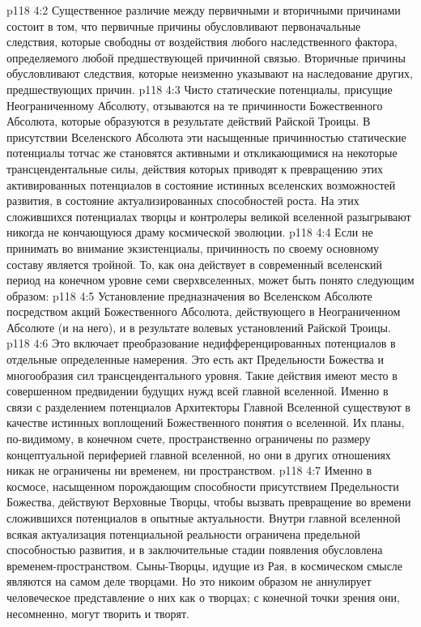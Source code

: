 \vs p118 4:2 Существенное различие между первичными и вторичными причинами состоит в том, что первичные причины обусловливают первоначальные следствия, которые свободны от воздействия любого наследственного фактора, определяемого любой предшествующей причинной связью. Вторичные причины обусловливают следствия, которые неизменно указывают на наследование других, предшествующих причин.
\vs p118 4:3 \pc Чисто статические потенциалы, присущие Неограниченному Абсолюту, отзываются на те причинности Божественного Абсолюта, которые образуются в результате действий Райской Троицы. В присутствии Вселенского Абсолюта эти насыщенные причинностью статические потенциалы тотчас же становятся активными и откликающимися на некоторые трансцендентальные силы, действия которых приводят к превращению этих активированных потенциалов в состояние истинных вселенских возможностей развития, в состояние актуализированных способностей роста. На этих сложившихся потенциалах творцы и контролеры великой вселенной разыгрывают никогда не кончающуюся драму космической эволюции.
\vs p118 4:4 Если не принимать во внимание экзистенциалы, причинность по своему основному составу является тройной. То, как она действует в современный вселенский период на конечном уровне семи сверхвселенных, может быть понято следующим образом:
\vs p118 4:5 \bibnobreakspace {} Установление предназначения во Вселенском Абсолюте посредством акций Божественного Абсолюта, действующего в Неограниченном Абсолюте (и на него), и в результате волевых установлений Райской Троицы.
\vs p118 4:6 \bibnobreakspace {} Это включает преобразование недифференцированных потенциалов в отдельные определенные намерения. Это есть акт Предельности Божества и многообразия сил трансцендентального уровня. Такие действия имеют место в совершенном предвидении будущих нужд всей главной вселенной. Именно в связи с разделением потенциалов Архитекторы Главной Вселенной существуют в качестве истинных воплощений Божественного понятия о вселенной. Их планы, по\hyp{}видимому, в конечном счете, пространственно ограничены по размеру концептуальной периферией главной вселенной, но  они в других отношениях никак не ограничены ни временем, ни пространством.
\vs p118 4:7 \bibnobreakspace {} Именно в космосе, насыщенном порождающим способности присутствием Предельности Божества, действуют Верховные Творцы, чтобы вызвать превращение во времени сложившихся потенциалов в опытные актуальности. Внутри главной вселенной всякая актуализация потенциальной реальности ограничена предельной способностью развития, и в заключительные стадии появления обусловлена временем\hyp{}пространством. Сыны\hyp{}Творцы, идущие из Рая, в космическом смысле являются на самом деле  творцами. Но это никоим образом не аннулирует человеческое представление о них как о творцах; с конечной точки зрения они, несомненно, могут творить и творят.
